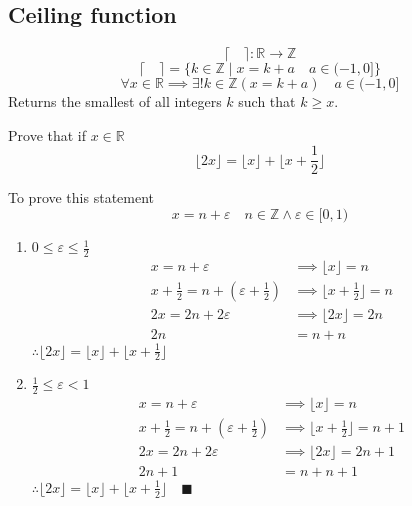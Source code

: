 \documentclass[letterpaper, 12pt]{article}
\newenvironment{proof}[1][Proof]{\begin{trivlist}
\item[\hskip \labelsep {\bfseries #1}]}{\end{trivlist}}
\newenvironment{example}[1][Example]{\begin{trivlist}
\item[\hskip \labelsep {\bfseries #1}]}{\end{trivlist}}
\newcommand{\qed}{\quad \blacksquare}
\newcommand{\Z}{\mathbb{Z}}
\newcommand{\R}{\mathbb{R}}
\newcommand{\0}{\emptyset}
\begin{document}
    \subsection*{Ceiling function}
    \[\lceil \quad \rceil : \R \to \Z\]
    \[\lceil \quad \rceil = \{k \in \Z \mid x = k + a \quad a \in (-1, 0]\}\]
    \[\forall x \in \R \implies \exists! k \in \Z(x = k + a) \quad a \in (-1, 0]\]
    Returns the smallest of all integers $k$ such that $k \ge x$.
    \begin{example}
        Prove that if $x \in \R$
        \[\lfloor 2x \rfloor = \lfloor x \rfloor + \lfloor x + \frac{1}{2} \rfloor\]
    \end{example}
    \begin{proof}
        To prove this statement 
        \[x = n + \varepsilon \quad n \in \Z \wedge \varepsilon \in [0, 1)\]
        \begin{enumerate}
            \item $0 \le \varepsilon \le \frac{1}{2}$
            \begin{align*}
                x = n + \varepsilon &\implies \lfloor x \rfloor = n \\
                x + \frac{1}{2} = n + (\varepsilon + \frac{1}{2}) 
                &\implies \lfloor x + \frac{1}{2} \rfloor = n \\
                2x = 2n + 2\varepsilon &\implies \lfloor 2x \rfloor = 2n \\
                2n &= n + n
            \end{align*}
            $\therefore \lfloor 2x \rfloor = \lfloor x \rfloor + \lfloor x + \frac{1}{2} \rfloor$
            \item $\frac{1}{2} \le \varepsilon < 1$
            \begin{align*}
                x = n + \varepsilon &\implies \lfloor x \rfloor = n \\
                x + \frac{1}{2} = n + (\varepsilon + \frac{1}{2}) 
                &\implies \lfloor x + \frac{1}{2} \rfloor = n + 1 \\
                2x = 2n + 2\varepsilon &\implies \lfloor 2x \rfloor = 2n + 1 \\
                2n + 1 &= n + n + 1
            \end{align*}
            $\therefore \lfloor 2x \rfloor = \lfloor x \rfloor + \lfloor x + \frac{1}{2} \rfloor \qed$
        \end{enumerate}
    \end{proof}
\end{document}
